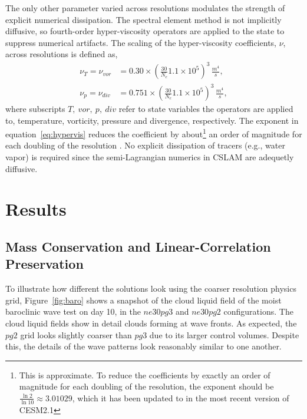 \documentclass[draft,linenumbers]{agujournal}
\begin{document}
The only other parameter varied across resolutions modulates the strength of explicit numerical dissipation. The spectral element method is not implicitly diffusive, so fourth-order hyper-viscosity operators are applied to the state to suppress numerical artifacts. The scaling of the hyper-viscosity coefficients, $\nu$, across resolutions is defined as,
\begin{align}
\nu_T = \nu_{vor} &= 0.30\times \left(\frac{30}{N_e}1.1\times 10^5\right)^3\, \frac{m^4}{s}, \\
\nu_p = \nu_{div} &= 0.751\times \left(\frac{30}{N_e}1.1\times 10^5\right)^3\, \frac{m^4}{s},
\label{eq:hypervis}
\end{align}
where subscripts $T,~vor,~p,~div$ refer to state variables the operators are applied to, temperature, vorticity, pressure and divergence, respectively. The exponent in equation~\eqref{eq:hypervis} reduces the coefficient by about\footnote{This is approximate. To reduce the coefficients by exactly an order of magnitude for each doubling of the resolution, the exponent should be $\frac{\ln{2}}{\ln{10}}\approx3.01029$, which it has been updated to in the most recent version of CESM2.1} an order of magnitude for each doubling of the resolution \citep[as in][]{LetAl2018JAMES}. No explicit dissipation of tracers (e.g., water vapor) is required since the semi-Lagrangian numerics in CSLAM are adequetly diffusive.

\section{Results}\label{sec:results}

\subsection{Mass Conservation and Linear-Correlation Preservation}\label{sec:fkessler}

To illustrate how different the solutions look using the coarser resolution physics grid, Figure~\ref{fig:baro} shows a snapshot of the cloud liquid field of the moist baroclinic wave test on day 10, in the $ne30pg3$ and $ne30pg2$ configurations. The cloud liquid fields show in detail clouds forming at wave fronts. As expected, the $pg2$ grid looks slightly coarser than $pg3$ due to its larger control volumes. Despite this, the details of the wave patterns look reasonably similar to one another.
\end{document}
